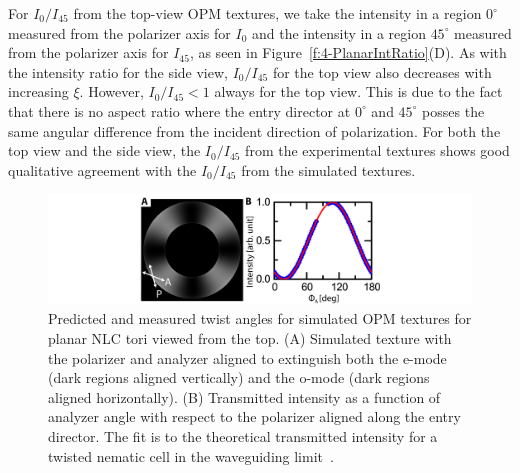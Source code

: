 For $I_0/I_{45}$ from the top-view OPM textures, we take the intensity in a region  $0^{\circ}$ measured from the polarizer axis for $I_0$ and the intensity in a region $45^{\circ}$ measured from the polarizer axis for $I_{45}$, as seen in Figure~\ref{f:4-PlanarIntRatio}(D).
As with the intensity ratio for the side view, $I_0/I_{45}$ for the top view also decreases with increasing $\xi$. However, $I_0/I_{45}<1$ always for the top view.
This is due to the fact that there is no aspect ratio where the entry director at $0^{\circ}$ and $45^{\circ}$ posses the same angular difference from the incident direction of polarization.
For both the top view and the side view, the $I_0/I_{45}$ from the experimental textures shows good qualitative agreement with the $I_0/I_{45}$ from the simulated textures.
\begin{figure}
\centering
\includegraphics{figures/C4/Ch4-Figs_MeasuredTwist.png}
\caption{Predicted and measured twist angles for simulated OPM textures for planar NLC tori viewed from the top.
(A) Simulated texture with the polarizer and analyzer aligned to extinguish both the e-mode (dark regions aligned vertically) and the o-mode (dark regions aligned horizontally).
(B) Transmitted intensity as a function of analyzer angle with respect to the polarizer aligned along the entry director.
The fit is to the theoretical transmitted intensity for a twisted nematic cell in the waveguiding limit~\cite{RN232}.}\label{f:4-PlanarTwist}
\end{figure}

